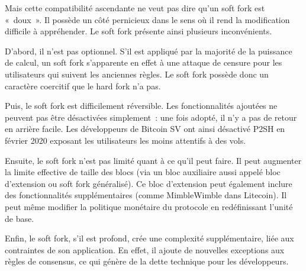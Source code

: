 Mais cette compatibilité ascendante ne veut pas dire qu'un soft fork est «~doux~». Il possède un côté pernicieux dans le sens où il rend la modification difficile à appréhender. Le soft fork présente ainsi plusieurs inconvénients.

D'abord, il n'est pas optionnel. S'il est appliqué par la majorité de la puissance de calcul, un soft fork s'apparente en effet à une attaque de censure pour les utilisateurs qui suivent les anciennes règles. Le soft fork possède donc un caractère coercitif que le hard fork n'a pas.

Puis, le soft fork est difficilement réversible. Les fonctionnalités ajoutées ne peuvent pas être désactivées simplement~: une fois adopté, il n'y a pas de retour en arrière facile. Les développeurs de Bitcoin SV ont ainsi désactivé P2SH en février 2020 exposant les utilisateurs les moins attentifs à des vols.

Ensuite, le soft fork n'est pas limité quant à ce qu'il peut faire. Il peut augmenter la limite effective de taille des blocs (via un bloc auxiliaire aussi appelé bloc d'extension ou soft fork généralisé). Ce bloc d'extension peut également inclure des fonctionnalités supplémentaires (comme MimbleWimble dans Litecoin). Il peut même modifier la politique monétaire du protocole en redéfinissant l'unité de base.

Enfin, le soft fork, s'il est profond, crée une complexité supplémentaire, liée aux contraintes de son application. En effet, il ajoute de nouvelles exceptions aux règles de consensus, ce qui génère de la dette technique pour les développeurs.

